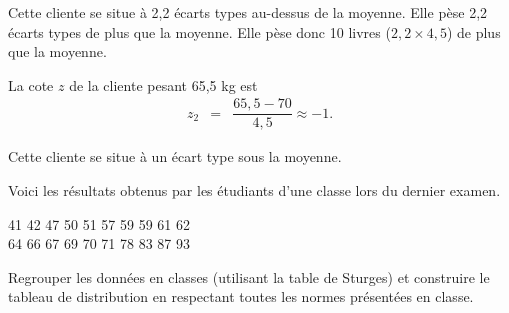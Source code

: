 \documentclass[answers, addpoints, 12pt,fleqn]{exam}
\theoremstyle{definition}       %
\begin{document}
\begin{questions}
\begin{solution}
Cette cliente se situe à 2,2 écarts types au-dessus de la moyenne. Elle pèse 2,2 écarts types de plus que la moyenne. Elle pèse donc 10 livres ($2,2\times 4,5$) de plus que la moyenne.
\vspace{0.2cm}

La cote $z$ de la cliente pesant 65,5 kg est 
\begin{eqnarray*}
z_{2}&=&\dfrac{65,5-70}{4,5}\approx -1.
\end{eqnarray*}

Cette cliente se situe à un écart type sous la moyenne.

\end{solution}

\bigskip

\question Voici les résultats obtenus par les étudiants d’une classe lors du dernier examen.

41 \hspace{0.2cm} 42 \hspace{0.2cm} 47 \hspace{0.2cm} 50 \hspace{0.2cm} 51 \hspace{0.2cm} 57 \hspace{0.2cm} 59 \hspace{0.2cm} 59 \hspace{0.2cm} 61  \hspace{0.2cm} 62\\ 
64 \hspace{0.2cm} 66 \hspace{0.2cm} 67 \hspace{0.2cm} 69 \hspace{0.2cm} 70 \hspace{0.2cm} 71 \hspace{0.2cm} 78 \hspace{0.2cm} 83 \hspace{0.2cm} 87 \hspace{0.2cm} 93 

Regrouper les données en classes (utilisant la table de Sturges) et construire le tableau de distribution en respectant toutes les normes présentées en classe.

\begin{solution}
\end{solution}
\end{questions}
\end{document}
